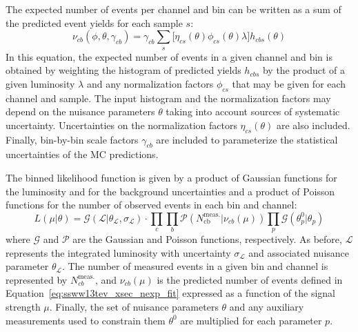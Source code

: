 The expected number of events per channel and bin can be written as a sum of the predicted event yields for each sample $s$:
\begin{equation}
  \nu_{cb}(\phi,\theta,\gamma_{cb}) = \gamma_{cb}\sum\limits_{s}\big[\eta_{cs}(\theta)\phi_{cs}(\theta)\lambda\big] h_{cbs}(\theta)
  \label{eq:ssww13tev_xsec_nexp_fit}
\end{equation}
In this equation, the expected number of events in a given channel and bin is obtained by weighting the histogram of predicted yields $h_{cbs}$ by the product of a given luminosity $\lambda$ and any normalization factors $\phi_{cs}$ that may be given for each channel and sample.
The input histogram and the normalization factors may depend on the nuisance parameters $\theta$ taking into account sources of systematic uncertainty.
Uncertainties on the normalization factors $\eta_{cs}(\theta)$ are also included.
Finally, bin-by-bin scale factors $\gamma_{cb}$ are included to parameterize the statistical uncertainties of the MC predictions.

The binned likelihood function is given by a product of Gaussian functions for the luminosity and for the background uncertainties and a product of Poisson functions for the number of observed events in each bin and channel:
\begin{equation}
  L(\mu|\theta) = \mathcal{G}(\mathcal{L}|\theta_{\mathcal{L}},\sigma_{\mathcal{L}})\cdot \prod\limits_{c}\prod\limits_{b}\mathcal{P}(N_{\textrm{cb}}^{\textrm{meas.}}|\nu_{cb}(\mu))\prod\limits_{p}\mathcal{G}(\theta_{p}^{0}|\theta_{p})
\end{equation}
where $\mathcal{G}$ and $\mathcal{P}$ are the Gaussian and Poisson functions, respectively.
As before, $\mathcal{L}$ represents the integrated luminosity with uncertainty $\sigma_{\mathcal{L}}$ and associated nuisance parameter $\theta_{\mathcal{L}}$.
The number of measured events in a given bin and channel is represented by $N_{cb}^{\textrm{meas.}}$, and $\nu_{cb}(\mu)$ is the predicted number of events defined in Equation~\ref{eq:ssww13tev_xsec_nexp_fit} expressed as a function of the signal strength $\mu$.
Finally, the set of nuisance parameters $\theta$ and any auxiliary measurements used to constrain them $\theta^0$ are multiplied for each parameter $p$.

